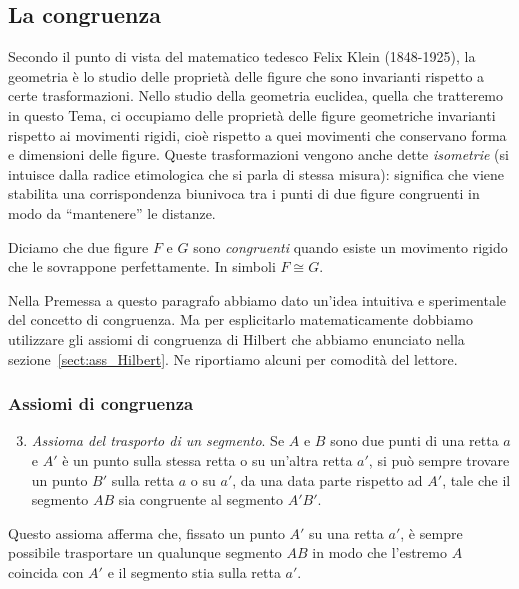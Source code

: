 \subsection{La congruenza}

Secondo il punto di vista del matematico tedesco Felix Klein 
(1848-1925), la geometria è lo studio delle proprietà delle figure 
che sono invarianti rispetto a certe trasformazioni. Nello studio 
della geometria euclidea, quella che tratteremo in questo Tema, ci 
occupiamo delle proprietà delle figure geometriche invarianti 
rispetto ai movimenti rigidi, cioè rispetto a quei movimenti che 
conservano forma e dimensioni delle figure. Queste trasformazioni 
vengono anche dette \emph{isometrie} (si intuisce dalla radice 
etimologica che si parla di stessa misura): significa che viene 
stabilita una corrispondenza biunivoca tra i punti di due figure 
congruenti in modo da ``mantenere'' le distanze.

\begin{definizione}
Diciamo che due figure $F$ e $G$ sono \emph{congruenti} quando esiste 
un movimento rigido che le sovrappone perfettamente. In simboli 
$F\cong G$.
\end{definizione}

Nella Premessa a questo paragrafo abbiamo dato un'idea intuitiva e 
sperimentale del concetto di congruenza. Ma per esplicitarlo 
matematicamente dobbiamo utilizzare gli assiomi di congruenza di 
Hilbert che abbiamo enunciato nella sezione~\ref{sect:ass_Hilbert}. 
Ne riportiamo alcuni per comodità del lettore.


\subsubsection{Assiomi di congruenza}

\begin{enumerate}[label=\Roman{*}.]
\setcounter{enumi}{2}
\item \emph{Assioma del trasporto di un segmento}. Se $A$ e $B$ sono 
due punti di una retta $a$ e $A'$ è un punto sulla stessa retta o su 
un'altra retta $a'$, si può sempre trovare un punto $B'$ sulla retta 
$a$ o su $a'$, da una data parte rispetto ad $A'$, tale che il 
segmento $AB$ sia congruente al segmento $A'B'$.
\end{enumerate}
Questo assioma afferma che, fissato un punto $A'$ su una retta $a'$, 
è sempre possibile trasportare un qualunque segmento $AB$ in modo che 
l'estremo $A$ coincida con $A'$ e il segmento stia sulla retta $a'$.

